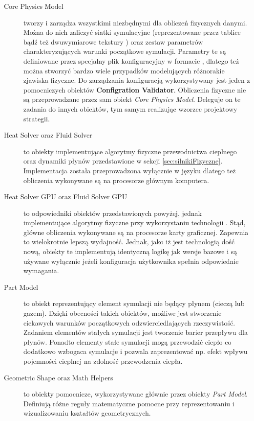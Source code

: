 \begin{description}

\item[Core Physics Model] tworzy i zarządza wszystkimi niezbędnymi dla obliczeń
fizycznych danymi. Można do nich zaliczyć siatki symulacyjne (reprezentowane
przez tablice \js bądź też dwuwymiarowe tekstury ) oraz zestaw
parametrów charakteryzujących warunki początkowe symulacji. Parametry te są
definiowane przez specjalny plik konfiguracyjny w formacie , dlatego
też można stworzyć bardzo wiele przypadków modelujących różnorakie zjawiska
fizyczne. Do zarządzania konfiguracją wykorzystywany jest jeden z pomocniczych
obiektów \textbf{Configration Validator}. Obliczenia fizyczne nie są
przeprowadzane przez sam obiekt \emph{Core Physics Model}. Deleguje on te
zadania do innych obiektów, tym samym realizując wzorzec projektowy strategii.

\item[Heat Solver oraz Fluid Solver] to obiekty implementujące algorytmy
fizyczne przewodnictwa cieplnego oraz dynamiki płynów przedstawione w sekcji
\ref{sec:silnikiFizyczne}. Implementacja została przeprowadzona wyłącznie w
języku \js dlatego też obliczenia wykonywane są na procesorze głównym
komputera.

\item[Heat Solver GPU oraz Fluid Solver GPU] to odpowiedniki obiektów
przedstawionych powyżej, jednak implementujące algorytmy fizyczne przy
wykorzystaniu technologii . Stąd, główne obliczenia wykonywane są na
procesorze karty graficznej. Zapewnia to wielokrotnie lepszą wydajność.
Jednak, jako iż  jest technologią dość nową, obiekty te implementują
identyczną logikę jak wersje bazowe i są używane wyłącznie jeżeli konfiguracja
użytkownika spełnia odpowiednie wymagania.

\item[Part Model] to obiekt reprezentujący element symulacji nie będący płynem
(cieczą lub gazem). Dzięki obecności takich obiektów, możliwe jest stworzenie
ciekawych warunków początkowych odzwierciedlających rzeczywistość.  Zadaniem
elementów stałych symulacji jest tworzenie barier przepływu dla płynów. Ponadto
elementy stałe symulacji mogą przewodzić ciepło co dodatkowo wzbogaca symulacje
i pozwala zaprezentować np. efekt wpływu pojemności cieplnej na zdolność
przewodzenia ciepła.

\item[Geometric Shape oraz Math Helpers] to obiekty pomocnicze, wykorzystywane
głównie przez obiekty \emph{Part Model}. Definiują różne reguły matematyczne
pomocne przy reprezentowaniu i wizualizowaniu kształtów geometrycznych.

\end{description}

